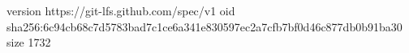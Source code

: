 version https://git-lfs.github.com/spec/v1
oid sha256:6c94cb68c7d5783bad7c1ce6a341e830597ec2a7cfb7bf0d46c877db0b91ba30
size 1732
